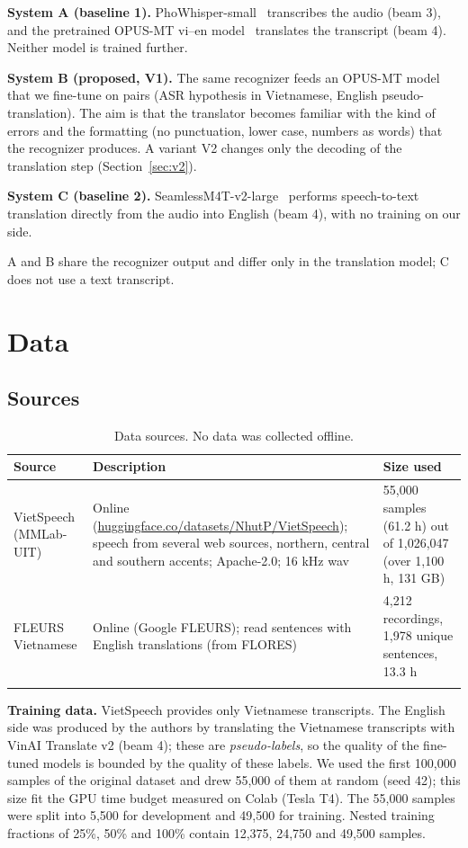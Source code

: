 \documentclass[pdflatex,sn-mathphys-num]{sn-jnl}
\begin{document}
\textbf{System A (baseline 1).} PhoWhisper-small~\cite{phowhisper} transcribes the audio (beam 3), and the pretrained OPUS-MT vi--en model~\cite{opusmt} translates the transcript (beam 4). Neither model is trained further.

\textbf{System B (proposed, V1).} The same recognizer feeds an OPUS-MT model that we fine-tune on pairs (ASR hypothesis in Vietnamese, English pseudo-translation). The aim is that the translator becomes familiar with the kind of errors and the formatting (no punctuation, lower case, numbers as words) that the recognizer produces. A variant V2 changes only the decoding of the translation step (Section~\ref{sec:v2}).

\textbf{System C (baseline 2).} SeamlessM4T-v2-large~\cite{seamless} performs speech-to-text translation directly from the audio into English (beam 4), with no training on our side.

A and B share the recognizer output and differ only in the translation model; C does not use a text transcript.

\section{Data}\label{sec:data}

\subsection{Sources}

\begin{table}[t]
\caption{Data sources. No data was collected offline.}\label{tab:sources}
\begin{tabular}{@{}p{2.3cm}p{5.2cm}p{4.2cm}@{}}
\toprule
Source & Description & Size used\\
\midrule
VietSpeech (MMLab-UIT) & Online (\url{huggingface.co/datasets/NhutP/VietSpeech}); speech from several web sources, northern, central and southern accents; Apache-2.0; 16 kHz wav & 55,000 samples (61.2 h) out of 1,026,047 (over 1,100 h, 131 GB)\\
FLEURS Vietnamese & Online (Google FLEURS); read sentences with English translations (from FLORES) & 4,212 recordings, 1,978 unique sentences, 13.3 h\\
\botrule
\end{tabular}
\end{table}

\textbf{Training data.} VietSpeech provides only Vietnamese transcripts. The English side was produced by the authors by translating the Vietnamese transcripts with VinAI Translate v2 (beam 4); these are \emph{pseudo-labels}, so the quality of the fine-tuned models is bounded by the quality of these labels. We used the first 100,000 samples of the original dataset and drew 55,000 of them at random (seed 42); this size fit the GPU time budget measured on Colab (Tesla T4). The 55,000 samples were split into 5,500 for development and 49,500 for training. Nested training fractions of 25\%, 50\% and 100\% contain 12,375, 24,750 and 49,500 samples.
\end{document}
